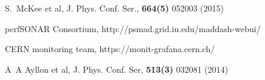 \begin{thebibliography}{}
S.~McKee et al, J. Phys. Conf. Ser., {\bf 664(5)} 052003 (2015)


perfSONAR Consortium,
http://psmad.grid.iu.edu/maddash-webui/

CERN monitoring team,
https://monit-grafana.cern.ch/

A~A Ayllon et al, 
J. Phys. Conf. Ser, {\bf 513(3)} 032081 (2014)

 










\end{thebibliography}
